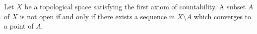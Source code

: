 Let $X$ be a topological space satisfying the first axiom of countability. A subset $A$ of $X$ is not open if and only if there exists a sequence in $X \setminus A$ which converges to a point of $A$.
